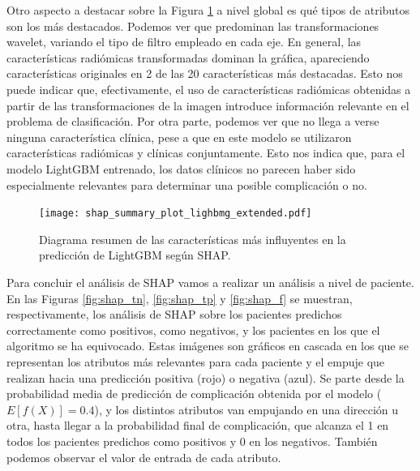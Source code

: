 Otro aspecto a destacar sobre la Figura \ref{fig:shap} a nivel global es qué tipos de atributos son los más destacados. Podemos ver que predominan las transformaciones wavelet, variando el tipo de filtro empleado en cada eje. En general, las características radiómicas transformadas dominan la gráfica, apareciendo características originales en 2 de las 20 características más destacadas. Esto nos puede indicar que, efectivamente, el uso de características radiómicas obtenidas a partir de las transformaciones de la imagen introduce información relevante en el problema de clasificación. Por otra parte, podemos ver que no llega a verse ninguna característica clínica, pese a que en este modelo se utilizaron características radiómicas y clínicas conjuntamente. Esto nos indica que, para el modelo LightGBM entrenado, los datos clínicos no parecen haber sido especialmente relevantes para determinar una posible complicación o no.

\begin{figure}
    \texttt{[image: shap\_summary\_plot\_lighbmg\_extended.pdf]} \caption{Diagrama resumen de las características más influyentes en la predicción de LightGBM según SHAP.}\label{fig:shap}
    
\end{figure}

Para concluir el análisis de SHAP vamos a realizar un análisis a nivel de paciente. En las Figuras \ref{fig:shap_tn}, \ref{fig:shap_tp} y \ref{fig:shap_f} se muestran, respectivamente, los análisis de SHAP sobre los pacientes predichos correctamente como positivos, como negativos, y los pacientes en los que el algoritmo se ha equivocado. Estas imágenes son gráficos en cascada en los que se representan los atributos más relevantes para cada paciente y el empuje que realizan hacia una predicción positiva (rojo) o negativa (azul). Se parte desde la probabilidad media de predicción de complicación obtenida por el modelo ($E[f(X)] = 0.4$), y los distintos atributos van empujando en una dirección u otra, hasta llegar a la probabilidad final de complicación, que alcanza el 1 en todos los pacientes predichos como positivos y 0 en los negativos. También podemos observar el valor de entrada de cada atributo.

